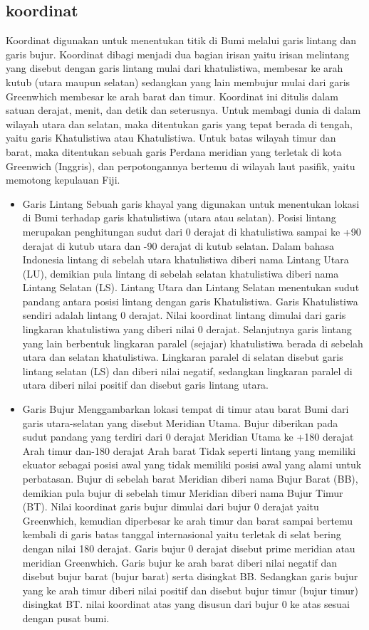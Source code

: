 \subsection{koordinat}
Koordinat digunakan untuk menentukan titik di Bumi melalui garis lintang dan garis bujur.  Koordinat dibagi menjadi dua bagian irisan yaitu irisan melintang yang disebut dengan garis lintang mulai dari khatulistiwa, membesar ke arah kutub (utara maupun selatan) sedangkan yang lain membujur mulai dari garis Greenwhich membesar ke arah barat dan timur.  Koordinat ini ditulis dalam satuan derajat, menit, dan detik dan seterusnya. Untuk membagi dunia di dalam wilayah utara dan selatan, maka ditentukan garis yang tepat berada di tengah, yaitu garis Khatulistiwa atau Khatulistiwa. Untuk batas wilayah timur dan  barat, maka ditentukan sebuah garis Perdana meridian yang terletak di kota Greenwich (Inggris), dan perpotongannya bertemu di wilayah laut pasifik, yaitu memotong kepulauan Fiji.
\begin{itemize}

\item Garis Lintang 
Sebuah garis khayal yang digunakan untuk menentukan lokasi di Bumi terhadap garis khatulistiwa (utara atau selatan).  Posisi lintang merupakan penghitungan sudut dari 0 derajat di khatulistiwa sampai ke +90 derajat di kutub utara dan -90 derajat di kutub selatan.  Dalam bahasa Indonesia lintang di sebelah utara khatulistiwa diberi nama Lintang Utara (LU), demikian pula lintang di sebelah selatan khatulistiwa diberi nama Lintang Selatan (LS).  Lintang Utara dan Lintang Selatan menentukan sudut pandang antara posisi lintang dengan garis Khatulistiwa.  Garis Khatulistiwa sendiri adalah lintang 0 derajat.  Nilai koordinat lintang dimulai dari garis lingkaran khatulistiwa yang diberi nilai 0 derajat.  Selanjutnya garis lintang yang lain berbentuk lingkaran paralel (sejajar) khatulistiwa berada di sebelah utara dan selatan khatulistiwa.  Lingkaran paralel di selatan disebut garis lintang selatan (LS) dan diberi nilai negatif, sedangkan lingkaran paralel di utara diberi nilai positif dan disebut garis lintang utara.
\item Garis Bujur
Menggambarkan lokasi tempat di timur atau barat Bumi dari garis utara-selatan yang disebut Meridian Utama.  Bujur diberikan pada sudut pandang yang terdiri dari 0 derajat Meridian Utama ke +180 derajat Arah timur dan-180 derajat Arah barat Tidak seperti lintang yang memiliki ekuator sebagai posisi awal yang tidak memiliki posisi awal yang alami untuk perbatasan.  Bujur di sebelah barat Meridian diberi nama Bujur Barat (BB), demikian pula bujur di sebelah timur Meridian diberi nama Bujur Timur (BT).  Nilai koordinat garis bujur dimulai dari bujur 0 derajat yaitu Greenwhich, kemudian diperbesar ke arah timur dan barat sampai bertemu kembali di garis batas tanggal internasional yaitu terletak di selat bering dengan nilai 180 derajat.  Garis bujur 0 derajat disebut prime meridian atau meridian Greenwhich.  Garis bujur ke arah barat diberi nilai negatif dan disebut bujur barat (bujur barat) serta disingkat BB.  Sedangkan garis bujur yang ke arah timur diberi nilai positif dan disebut bujur timur (bujur timur) disingkat BT.  nilai koordinat atas yang disusun dari bujur 0 ke atas sesuai dengan pusat bumi.
\end{itemize}
